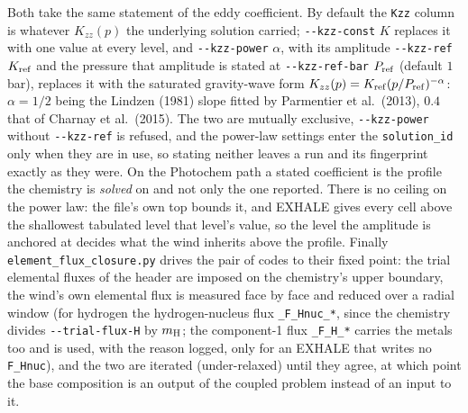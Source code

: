 \documentclass[english,a4paper]{my_memo}
\begin{document}
Both take the same statement of the eddy coefficient. By default the
\texttt{Kzz} column is whatever $K_{zz}(p)$ the underlying solution carried;
\texttt{-{}-kzz-const} $K$ replaces it with one value at every level, and
\texttt{-{}-kzz-power} $\alpha$, with its amplitude \texttt{-{}-kzz-ref}
$K_{\rm ref}$ and the pressure that amplitude is stated at
\texttt{-{}-kzz-ref-bar} $P_{\rm ref}$ (default $1$\,bar), replaces it with
the saturated gravity-wave form $K_{zz}(p) = K_{\rm ref}
(p/P_{\rm ref})^{-\alpha}$: $\alpha = 1/2$ being the Lindzen (1981) slope
fitted by Parmentier et al.\ (2013), $0.4$ that of Charnay et al.\ (2015).
The two are mutually exclusive, \texttt{-{}-kzz-power} without
\texttt{-{}-kzz-ref} is refused, and the power-law settings enter the
\texttt{solution\_id} only when they are in use, so stating neither leaves a
run and its fingerprint exactly as they were. On the Photochem path a stated
coefficient is the profile the chemistry is \emph{solved} on and not only the
one reported. There is no ceiling on the power law: the file's own top bounds
it, and EXHALE gives every cell above the shallowest tabulated level that
level's value, so the level the amplitude is anchored at decides what the wind
inherits above the profile. Finally
\texttt{element\_flux\_closure.py} drives the pair of codes to their fixed
point: the trial elemental fluxes of the header are imposed on the chemistry's
upper boundary, the wind's own elemental flux is measured face by face and
reduced over a radial window (for hydrogen the hydrogen-nucleus flux
\texttt{\_F\_Hnuc\_*}, since the chemistry divides \texttt{-{}-trial-flux-H}
by $m_{\rm H}$; the component-1 flux \texttt{\_F\_H\_*} carries the metals
too and is used, with the reason logged, only for an EXHALE that writes no
\texttt{F\_Hnuc}), and the two are iterated (under-relaxed) until
they agree, at which point the base composition is an output of the coupled
problem instead of an input to it.
\end{document}

